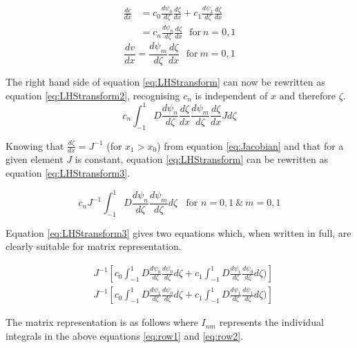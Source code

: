 \documentclass[11pt]{article}
\begin{document}
\begin{align}\label{eq:LagrangeDC}
\frac{dc}{dx} &= c_{0}\frac{d\psi_{0}}{d\zeta}\frac{d\zeta}{dx} + c_1\frac{d\psi_{1}}{d\zeta}\frac{d\zeta}{dx}\\
 &= c_n\frac{d\psi_{n}}{d\zeta}\frac{d\zeta}{dx} \label{eq:LagrangeDC} \ \ \ \text{for} \ n =0,1 \nonumber
\end{align}
\begin{equation}
\label{eq:LagrangeDV} 
\frac{dv}{dx} = \frac{d\psi_{m}}{d\zeta}\frac{d\zeta}{dx} \ \ \ \text{for} \ m =0,1 
\end{equation}

The right hand side of equation \ref{eq:LHStransform} can now be rewritten as equation \ref{eq:LHStransform2}, recognising $c_n$ is independent of $x$ and therefore $\zeta$.
\begin{equation} \label{eq:LHStransform2}
 c_n\int_{-1}^{1} D \frac{d\psi_{n}}{d\zeta}\frac{d\zeta}{dx} \frac{d\psi_{m}}{d\zeta}\frac{d\zeta}{dx} J d\zeta
\end{equation}

Knowing that $\frac{d\zeta}{dx} = J^{-1}$ (for $x_1 > x_0$) from equation \ref{eq:Jacobian} and that for a given element $J$ is constant, equation \ref{eq:LHStransform} can be rewritten as equation \ref{eq:LHStransform3}.

\begin{equation} \label{eq:LHStransform3}
 c_nJ^{-1}\int_{-1}^{1} D \frac{d\psi_{n}}{d\zeta}\frac{d\psi_{m}}{d\zeta} d\zeta \ \ \ \ \text{for \ } n= 0,1 \ \text{\&}  \ m = 0,1
\end{equation}


Equation \ref{eq:LHStransform3} gives two equations which, when written in full, are clearly suitable for matrix representation.

\begin{subequations}
\label{eq:matrixform}
\begin{align}
&J^{-1} \left  [c_0 \int_{-1}^{1} D \frac{d\psi_{0}}{d\zeta} \frac{d\psi_{0}}{d \zeta} d \zeta + c_1 \int_{-1}^{1} D \frac{d\psi_{1}}{d\zeta} \frac{d\psi_{0}}{d\zeta}d\zeta ) \right ] \label{eq:row1} \\
&J^{-1} \left  [ c_0 \int_{-1}^{1} D \frac{d\psi_{1}}{d\zeta} \frac{d\psi_{0}}{d \zeta} d \zeta + c_1 \int_{-1}^{1} D \frac{d\psi_{1}}{d\zeta} \frac{d\psi_{1}}{d\zeta}d\zeta ) \right ] \label{eq:row2} 
\end{align}
\end{subequations}

The matrix representation is as follows where $I_{nm}$ represents the individual integrals in the above equations \ref{eq:row1} and \ref{eq:row2}. 
\end{document}
